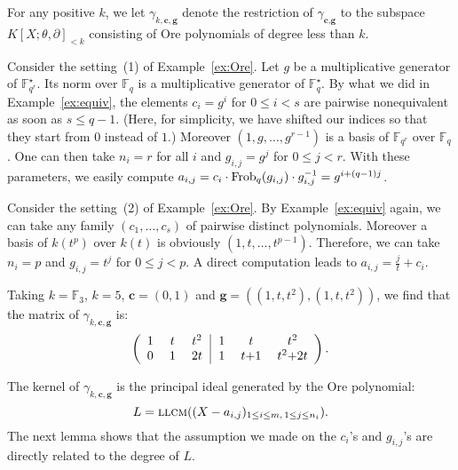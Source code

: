 \documentclass[a4paper]{llncs}
\newcommand{\FF}{\mathbb F}
\newcommand{\Frob}{\textrm{\rm Frob}}
\newcommand{\llcm}{\textsc{llcm}}
\newcommand{\bc}{\textbf{c}}
\newcommand{\bg}{\textbf{g}}
\begin{document}
For any positive $k$, we let $\gamma_{k,\bc,\bg}$ denote the 
restriction of $\gamma_{\bc,\bg}$ to the subspace 
$K[X;\theta,\partial]_{<k}$ consisting of Ore polynomials of
degree less than $k$.

{\small
\begin{example}
\label{ex:aij1}
Consider the setting~(1) of Example~\ref{ex:Ore}. Let $g$ be a 
multiplicative generator of $\FF_{q^r}^\star$. Its norm over $\FF_q$ is 
a multiplicative generator of $\FF_q^\star$. By what we did in 
Example~\ref{ex:equiv}, the elements $c_i = g^i$ for $0 \leq i < s$ 
are pairwise nonequivalent as soon as $s \leq q-1$. (Here, for
simplicity, we have shifted our indices so that they start from $0$
instead of $1$.)
Moreover $(1, g, \ldots, g^{r-1})$ is a 
basis of $\FF_{q^r}$ over $\FF_q$. One can then take $n_i = r$ for all 
$i$ and $g_{i,j} = g^j$ for $0 \leq j < r$. With these parameters, we 
easily compute $a_{i,j} = c_i \cdot \Frob_q(g_{i,j}) \cdot g_{i,j}^{-1} 
= g^{i + (q-1)j}$.
\end{example}

\begin{example}
\label{ex:aij2}
Consider the setting~(2) of Example~\ref{ex:Ore}.
By Example~\ref{ex:equiv} again, we can take any family $(c_1, \ldots, 
c_s)$ of pairwise distinct polynomials. Moreover a basis of $k(t^p)$ 
over $k(t)$ is obviously $(1, t, \ldots, t^{p-1})$. Therefore, we can 
take $n_i = p$ and $g_{i,j} = t^j$ for $0 \leq j < p$. A direct 
computation leads to $a_{i,j} = \frac j t + c_i$. 

\noindent
Taking $k = \FF_3$, $k = 5$, $\bc = (0,1)$ and $\bg = 
((1,t,t^2),(1,t,t^2))$, we find that the matrix of
$\gamma_{k,\bc,\bg}$ is:
\begin{equation}
\label{eq:gamma}
\left(\begin{array}{c@{\hspace{3ex}}c@{\hspace{3ex}}c@{\hspace{1.5ex}}|
@{\hspace{1.5ex}}c@{\hspace{3ex}}c@{\hspace{3ex}}c}
1 & t & t^2 &
1 & t & t^2 \\
0 & 1 & 2t &
1 & t{+}1 & t^2{+}2t 
\end{array} \right).
\end{equation}
\end{example}}

The kernel of $\gamma_{k,\bc,\bg}$ is the principal ideal generated
by the Ore polynomial:
\begin{equation}
\label{eq:defL}
L = \llcm((X - a_{i,j})_{1 \leq i \leq m,\,1 \leq j \leq n_i}).
\end{equation}
The next lemma shows that the assumption we made on the $c_i$'s
and $g_{i,j}$'s are directly related to the degree of $L$.
\end{document}

